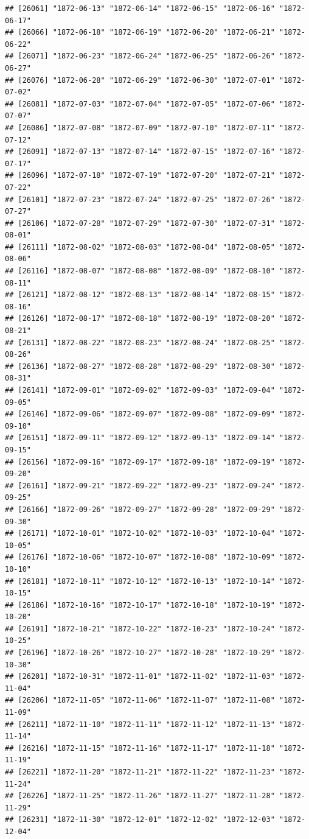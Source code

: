 \documentclass{article}\usepackage[]{graphicx}\usepackage[]{color}
\makeatletter
\newenvironment{kframe}{%
 \def\at@end@of@kframe{}%
 \ifinner\ifhmode%
  \def\at@end@of@kframe{\end{minipage}}%
  \begin{minipage}{\columnwidth}%
 \fi\fi%
 \def\FrameCommand##1{\hskip\@totalleftmargin \hskip-\fboxsep
 \colorbox{shadecolor}{##1}\hskip-\fboxsep
     \hskip-\linewidth \hskip-\@totalleftmargin \hskip\columnwidth}%
 \MakeFramed {\advance\hsize-\width
   \@totalleftmargin\z@ \linewidth\hsize
   \@setminipage}}%
 {\par\unskip\endMakeFramed%
 \at@end@of@kframe}
\newenvironment{knitrout}{}{} %
\makeatother
\begin{document}
\begin{description}
\begin{knitrout}
\begin{kframe}
\begin{verbatim}
## [26061] "1872-06-13" "1872-06-14" "1872-06-15" "1872-06-16" "1872-06-17"
## [26066] "1872-06-18" "1872-06-19" "1872-06-20" "1872-06-21" "1872-06-22"
## [26071] "1872-06-23" "1872-06-24" "1872-06-25" "1872-06-26" "1872-06-27"
## [26076] "1872-06-28" "1872-06-29" "1872-06-30" "1872-07-01" "1872-07-02"
## [26081] "1872-07-03" "1872-07-04" "1872-07-05" "1872-07-06" "1872-07-07"
## [26086] "1872-07-08" "1872-07-09" "1872-07-10" "1872-07-11" "1872-07-12"
## [26091] "1872-07-13" "1872-07-14" "1872-07-15" "1872-07-16" "1872-07-17"
## [26096] "1872-07-18" "1872-07-19" "1872-07-20" "1872-07-21" "1872-07-22"
## [26101] "1872-07-23" "1872-07-24" "1872-07-25" "1872-07-26" "1872-07-27"
## [26106] "1872-07-28" "1872-07-29" "1872-07-30" "1872-07-31" "1872-08-01"
## [26111] "1872-08-02" "1872-08-03" "1872-08-04" "1872-08-05" "1872-08-06"
## [26116] "1872-08-07" "1872-08-08" "1872-08-09" "1872-08-10" "1872-08-11"
## [26121] "1872-08-12" "1872-08-13" "1872-08-14" "1872-08-15" "1872-08-16"
## [26126] "1872-08-17" "1872-08-18" "1872-08-19" "1872-08-20" "1872-08-21"
## [26131] "1872-08-22" "1872-08-23" "1872-08-24" "1872-08-25" "1872-08-26"
## [26136] "1872-08-27" "1872-08-28" "1872-08-29" "1872-08-30" "1872-08-31"
## [26141] "1872-09-01" "1872-09-02" "1872-09-03" "1872-09-04" "1872-09-05"
## [26146] "1872-09-06" "1872-09-07" "1872-09-08" "1872-09-09" "1872-09-10"
## [26151] "1872-09-11" "1872-09-12" "1872-09-13" "1872-09-14" "1872-09-15"
## [26156] "1872-09-16" "1872-09-17" "1872-09-18" "1872-09-19" "1872-09-20"
## [26161] "1872-09-21" "1872-09-22" "1872-09-23" "1872-09-24" "1872-09-25"
## [26166] "1872-09-26" "1872-09-27" "1872-09-28" "1872-09-29" "1872-09-30"
## [26171] "1872-10-01" "1872-10-02" "1872-10-03" "1872-10-04" "1872-10-05"
## [26176] "1872-10-06" "1872-10-07" "1872-10-08" "1872-10-09" "1872-10-10"
## [26181] "1872-10-11" "1872-10-12" "1872-10-13" "1872-10-14" "1872-10-15"
## [26186] "1872-10-16" "1872-10-17" "1872-10-18" "1872-10-19" "1872-10-20"
## [26191] "1872-10-21" "1872-10-22" "1872-10-23" "1872-10-24" "1872-10-25"
## [26196] "1872-10-26" "1872-10-27" "1872-10-28" "1872-10-29" "1872-10-30"
## [26201] "1872-10-31" "1872-11-01" "1872-11-02" "1872-11-03" "1872-11-04"
## [26206] "1872-11-05" "1872-11-06" "1872-11-07" "1872-11-08" "1872-11-09"
## [26211] "1872-11-10" "1872-11-11" "1872-11-12" "1872-11-13" "1872-11-14"
## [26216] "1872-11-15" "1872-11-16" "1872-11-17" "1872-11-18" "1872-11-19"
## [26221] "1872-11-20" "1872-11-21" "1872-11-22" "1872-11-23" "1872-11-24"
## [26226] "1872-11-25" "1872-11-26" "1872-11-27" "1872-11-28" "1872-11-29"
## [26231] "1872-11-30" "1872-12-01" "1872-12-02" "1872-12-03" "1872-12-04"

\end{verbatim}
\end{kframe}
\end{knitrout}
\end{description}
\end{document}
